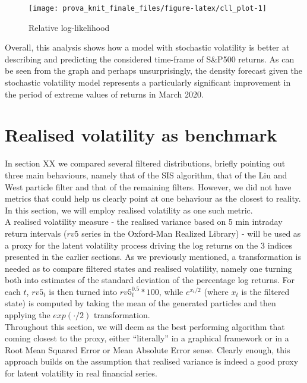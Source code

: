 \documentclass[
]{book}
\theoremstyle{break}
\theoremstyle{nonumberplain}
\begin{document}
\begin{figure}[H]

{\centering \texttt{[image: prova\_knit\_finale\_files/figure-latex/cll\_plot-1]} 

}

\caption{Relative log-likelihood}\label{fig:cll_plot}
\end{figure}

Overall, this analysis shows how a model with stochastic volatility is
better at describing and predicting the considered time-frame of S\&P500
returns. As can be seen from the graph and perhaps unsurprisingly, the
density forecast given the stochastic volatility model represents a
particularly significant improvement in the period of extreme values of
returns in March 2020.

\section{Realised volatility as benchmark}

In section XX we compared several filtered distributions, briefly
pointing out three main behaviours, namely that of the SIS algorithm,
that of the Liu and West particle filter and that of the remaining
filters. However, we did not have metrics that could help us clearly
point at one behaviour as the closest to reality. In this section, we
will employ realised volatility as one such metric.\\
A realised volatility measure - the realised variance based on 5 min
intraday return intervals (\(rv5\) series in the Oxford-Man Realized
Library) - will be used as a proxy for the latent volatility process
driving the log returns on the 3 indices presented in the earlier
sections. As we previously mentioned, a transformation is needed as to
compare filtered states and realised volatility, namely one turning both
into estimates of the standard deviation of the percentage log returns.
For each \(t\), \(rv5_t\) is then turned into \(rv5_t^{0.5}*100\), while
\(e^{x_t/2}\) (where \(x_t\) is the filtered state) is computed by
taking the mean of the generated particles and then applying the
\(exp(\cdot /2)\) transformation.\\
Throughout this section, we will deem as the best performing algorithm
that coming closest to the proxy, either ``literally'' in a graphical
framework or in a Root Mean Squared Error or Mean Absolute Error sense.
Clearly enough, this approach builds on the assumption that realised
variance is indeed a good proxy for latent volatility in real financial
series.\\
\end{document}
